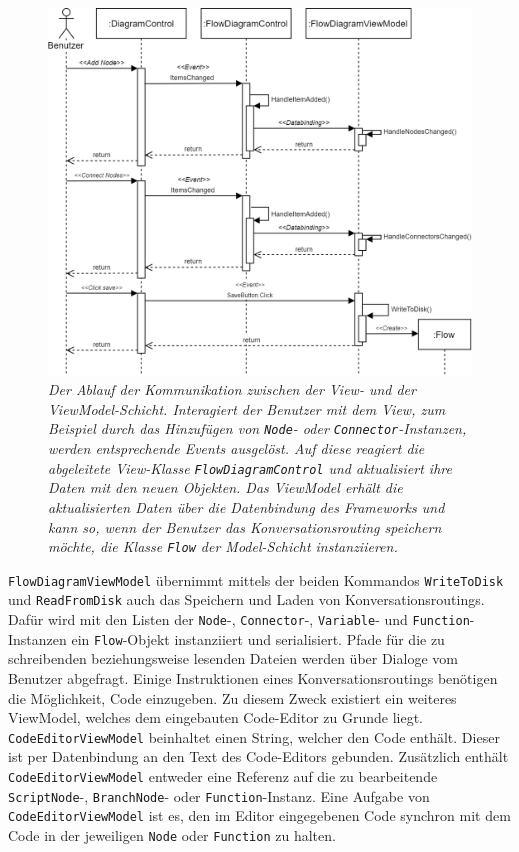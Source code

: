 \begin{figure} %
	\centering
		\includegraphics[width=\textwidth]{img/MVVMSequence.png}
	\caption[Kommunikationsablauf zwischen View- und ViewModel-Schicht]{\textit{Der Ablauf der Kommunikation zwischen der View- und der ViewModel-Schicht. Interagiert der Benutzer mit dem View, zum Beispiel durch das Hinzufügen von \texttt{Node}- oder \texttt{Connector}-Instanzen, werden entsprechende Events ausgelöst. Auf diese reagiert die abgeleitete View-Klasse \texttt{FlowDiagramControl} und aktualisiert ihre Daten mit den neuen Objekten. Das ViewModel erhält die aktualisierten Daten über die Datenbindung des Frameworks und kann so, wenn der Benutzer das Konversationsrouting speichern möchte, die Klasse \texttt{Flow} der Model-Schicht instanziieren.}}
	\label{fig:UML:MVVMSequence}
\end{figure}
\texttt{FlowDiagramViewModel} übernimmt mittels der beiden Kommandos \texttt{Write\-To\-Disk} und \texttt{Read\-From\-Disk} auch das Speichern und Laden von Konversationsroutings. Dafür wird mit den Listen der \texttt{Node}-, \texttt{Connector}-, \texttt{Variable}- und \texttt{Function}-Instanzen ein \texttt{Flow}-Objekt instanziiert und serialisiert. Pfade für die zu schreibenden beziehungsweise lesenden Dateien werden über Dialoge vom Benutzer abgefragt.
\newline
Einige Instruktionen eines Konversationsroutings benötigen die Möglichkeit, Code einzugeben. Zu diesem Zweck existiert ein weiteres ViewModel, welches dem eingebauten Code-Editor zu Grunde liegt. \texttt{CodeEditorViewModel} beinhaltet einen String, welcher den Code enthält. Dieser ist per Datenbindung an den Text des Code-Editors gebunden. Zusätzlich enthält \texttt{CodeEditorViewModel} entweder eine Referenz auf die zu bearbeitende \texttt{ScriptNode}-, \texttt{BranchNode}- oder \texttt{Function}-Instanz. Eine Aufgabe von \texttt{CodeEditorViewModel} ist es, den im Editor eingegebenen Code synchron mit dem Code in der jeweiligen \texttt{Node} oder \texttt{Function} zu halten. 
